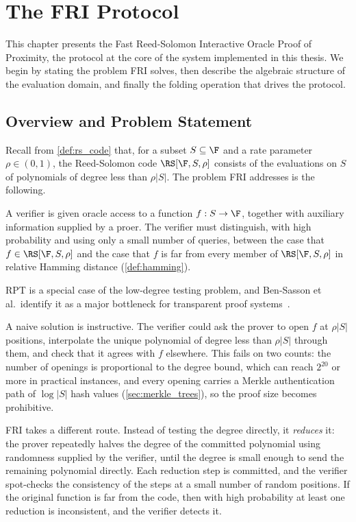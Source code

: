 \chapter{The FRI Protocol}
\label{ch:fri}
 
This chapter presents the Fast Reed-Solomon Interactive Oracle Proof of
Proximity, the protocol at the core of the system implemented in
this thesis. We begin by stating the problem FRI solves, then describe
the algebraic structure of the evaluation domain, and finally the
folding operation that drives the protocol.

\section{Overview and Problem Statement}
\label{sec:fri_overview}

 
Recall from \cref{def:rs_code} that, for a subset $S \subseteq \F$ and
a rate parameter $\rho \in (0,1)$, the Reed-Solomon code
$\RS[\F, S, \rho]$ consists of the evaluations on $S$ of polynomials of
degree less than $\rho|S|$. The problem FRI addresses is the following.
 
\begin{definition}
\label{def:rpt}
A verifier is given oracle access to a function $f : S \to \F$, together
with auxiliary information supplied by a proer. The verifier must
distinguish, with high probability and using only a small number of
queries, between the case that $f \in \RS[\F, S, \rho]$ and the case
that $f$ is far from every member of $\RS[\F, S, \rho]$ in relative
Hamming distance (\cref{def:hamming}).
\end{definition}
 
RPT is a special case of the low-degree testing problem, and
Ben-Sasson et al.\ identify it as a major bottleneck for transparent
proof systems~\cite[Section~2.1]{BBHR18}.
 
A naive solution is instructive. The verifier could ask the prover to
open $f$ at $\rho|S|$ positions, interpolate the unique polynomial of
degree less than $\rho|S|$ through them, and check that it agrees with
$f$ elsewhere. This fails on two counts: the number of openings is
proportional to the degree bound, which can reach $2^{20}$ or more in
practical instances, and every opening carries a Merkle authentication
path of $\log|S|$ hash values (\cref{sec:merkle_trees}), so the proof
size becomes prohibitive.
 
FRI takes a different route. Instead of testing the degree directly,
it \emph{reduces} it: the prover repeatedly halves the degree of the
committed polynomial using randomness supplied by the verifier, until
the degree is small enough to send the remaining polynomial directly.
Each reduction step is committed, and the verifier spot-checks the
consistency of the steps at a small number of random positions. If the
original function is far from the code, then with high probability at
least one reduction is inconsistent, and the verifier detects it.
 
